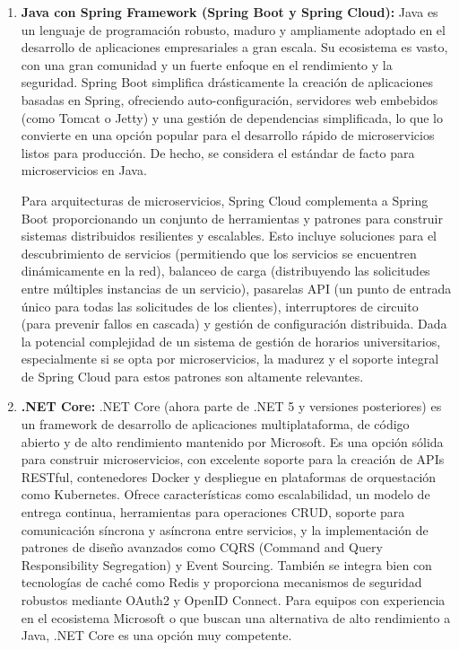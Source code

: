 \begin{enumerate}
    \item \textbf{Java con Spring Framework (Spring Boot y Spring Cloud):}
    Java es un lenguaje de programación robusto, maduro y ampliamente adoptado en el desarrollo de aplicaciones empresariales a gran escala. Su ecosistema es vasto, con una gran comunidad y un fuerte enfoque en el rendimiento y la seguridad. Spring Boot simplifica drásticamente la creación de aplicaciones basadas en Spring, ofreciendo auto-configuración, servidores web embebidos (como Tomcat o Jetty) y una gestión de dependencias simplificada, lo que lo convierte en una opción popular para el desarrollo rápido de microservicios listos para producción. De hecho, se considera el estándar de facto para microservicios en Java.

    Para arquitecturas de microservicios, Spring Cloud complementa a Spring Boot proporcionando un conjunto de herramientas y patrones para construir sistemas distribuidos resilientes y escalables. Esto incluye soluciones para el descubrimiento de servicios (permitiendo que los servicios se encuentren dinámicamente en la red), balanceo de carga (distribuyendo las solicitudes entre múltiples instancias de un servicio), pasarelas API (un punto de entrada único para todas las solicitudes de los clientes), interruptores de circuito (para prevenir fallos en cascada) y gestión de configuración distribuida. Dada la potencial complejidad de un sistema de gestión de horarios universitarios, especialmente si se opta por microservicios, la madurez y el soporte integral de Spring Cloud para estos patrones son altamente relevantes.

    \item \textbf{.NET Core:}
    .NET Core (ahora parte de .NET 5 y versiones posteriores) es un framework de desarrollo de aplicaciones multiplataforma, de código abierto y de alto rendimiento mantenido por Microsoft. Es una opción sólida para construir microservicios, con excelente soporte para la creación de APIs RESTful, contenedores Docker y despliegue en plataformas de orquestación como Kubernetes. Ofrece características como escalabilidad, un modelo de entrega continua, herramientas para operaciones CRUD, soporte para comunicación síncrona y asíncrona entre servicios, y la implementación de patrones de diseño avanzados como CQRS (Command and Query Responsibility Segregation) y Event Sourcing. También se integra bien con tecnologías de caché como Redis y proporciona mecanismos de seguridad robustos mediante OAuth2 y OpenID Connect. Para equipos con experiencia en el ecosistema Microsoft o que buscan una alternativa de alto rendimiento a Java, .NET Core es una opción muy competente.


\end{enumerate}
